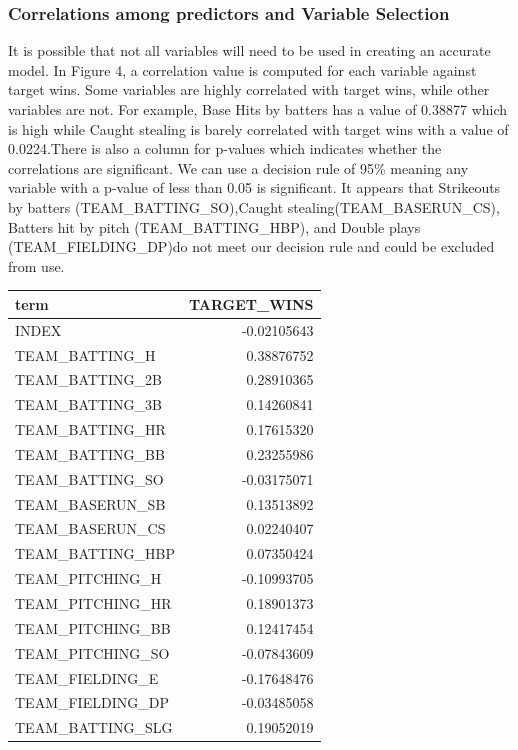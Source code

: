 \documentclass[
]{article}
\begin{document}
\hypertarget{correlations-among-predictors-and-variable-selection}{%
\subsubsection{Correlations among predictors and Variable
Selection}\label{correlations-among-predictors-and-variable-selection}}

It is possible that not all variables will need to be used in creating
an accurate model. In Figure 4, a correlation value is computed for each
variable against target wins. Some variables are highly correlated with
target wins, while other variables are not. For example, Base Hits by
batters has a value of 0.38877 which is high while Caught stealing is
barely correlated with target wins with a value of 0.0224.There is also
a column for p-values which indicates whether the correlations are
significant. We can use a decision rule of 95\% meaning any variable
with a p-value of less than 0.05 is significant. It appears that
Strikeouts by batters (TEAM\_BATTING\_SO),Caught
stealing(TEAM\_BASERUN\_CS), Batters hit by pitch (TEAM\_BATTING\_HBP),
and Double plays (TEAM\_FIELDING\_DP)do not meet our decision rule and
could be excluded from use.

\captionsetup[table]{labelformat=empty,skip=1pt}
\begin{longtable}{lr}
\toprule
term & TARGET\_WINS \\ 
\midrule
INDEX & -0.02105643 \\ 
TEAM\_BATTING\_H & 0.38876752 \\ 
TEAM\_BATTING\_2B & 0.28910365 \\ 
TEAM\_BATTING\_3B & 0.14260841 \\ 
TEAM\_BATTING\_HR & 0.17615320 \\ 
TEAM\_BATTING\_BB & 0.23255986 \\ 
TEAM\_BATTING\_SO & -0.03175071 \\ 
TEAM\_BASERUN\_SB & 0.13513892 \\ 
TEAM\_BASERUN\_CS & 0.02240407 \\ 
TEAM\_BATTING\_HBP & 0.07350424 \\ 
TEAM\_PITCHING\_H & -0.10993705 \\ 
TEAM\_PITCHING\_HR & 0.18901373 \\ 
TEAM\_PITCHING\_BB & 0.12417454 \\ 
TEAM\_PITCHING\_SO & -0.07843609 \\ 
TEAM\_FIELDING\_E & -0.17648476 \\ 
TEAM\_FIELDING\_DP & -0.03485058 \\ 
TEAM\_BATTING\_SLG & 0.19052019 \\ 
\bottomrule
\end{longtable}
\end{document}
